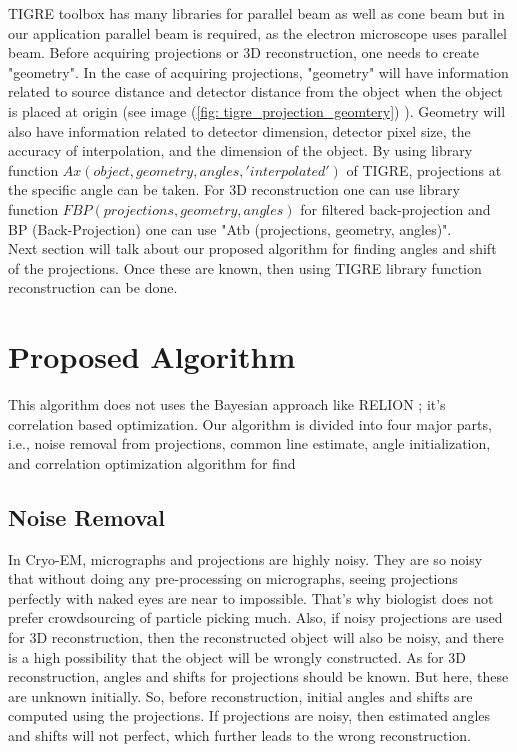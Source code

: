 \documentclass[twoside]{iitbreport}
\begin{document}
TIGRE toolbox has many libraries for parallel beam as well as cone beam but in our application parallel beam is required, as the electron microscope uses parallel beam. Before acquiring projections or 3D reconstruction, one needs to create "geometry". In the case of acquiring projections, "geometry" will have information related to source distance and detector distance from the object when the object is placed at origin (see image (\ref{fig: tigre_projection_geomtery}) ). Geometry will also have information related to detector dimension, detector pixel size, the accuracy of interpolation, and the dimension of the object. By using library function $Ax (object, geometry, angles, 'interpolated')$ of TIGRE, projections at the specific angle can be taken. For 3D reconstruction one can use library function $FBP(projections, geometry, angles)$ for filtered back-projection and  BP (Back-Projection) one can use "Atb (projections, geometry, angles)". \\

Next section will talk about our proposed algorithm for finding angles and shift of the projections. Once these are known,  then using TIGRE library function reconstruction can be done.

\section{Proposed Algorithm}\label{sec: Proposed_Algorithm}
This algorithm does not uses the Bayesian approach like RELION \cite{scheres2012relion}; it's correlation based optimization. Our algorithm is divided into four major parts, i.e., noise removal from projections, common line estimate, angle initialization, and correlation optimization algorithm for find

\subsection{Noise Removal} \label{subsec: noise-removal from projection}

In Cryo-EM, micrographs and projections are highly noisy. They are so noisy that without doing any pre-processing on micrographs, seeing projections perfectly with naked eyes are near to impossible. That's why biologist does not prefer crowdsourcing of particle picking \cite{bruggemann2017exploring} much. Also, if noisy projections are used for 3D reconstruction, then the reconstructed object will also be noisy, and there is a high possibility that the object will be wrongly constructed. As for 3D reconstruction, angles and shifts for projections should be known. But here, these are unknown initially. So, before reconstruction, initial angles and shifts are computed using the projections. If projections are noisy, then estimated angles and shifts will not perfect, which further leads to the wrong reconstruction. 
\end{document}
